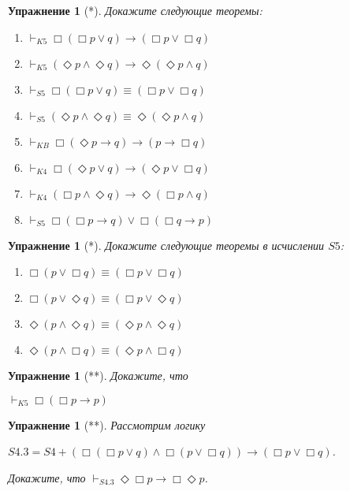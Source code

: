 \documentclass[11pt]{article}
\newtheorem{exercise}[theorem]{Упражнение}
\begin{document}
\begin{exercise}[*] Докажите следующие теоремы:
\begin{multicols}{2}
\begin{enumerate}
    \item $\vdash_{K5} \Box (\Box p \vee q ) \to (\Box p \vee \Box q)$
    \item $\vdash_{K5} (\Diamond p \wedge \Diamond q) \to \Diamond (\Diamond p \wedge q) $
    \item $\vdash_{S5} \Box (\Box p \vee q ) \equiv (\Box p \vee \Box q)$
    \item $\vdash_{S5} (\Diamond p \wedge \Diamond q) \equiv \Diamond (\Diamond p \wedge q) $
    \item $\vdash_{KB} \Box (\Diamond p \to q) \to (p \to \Box q)$
    \item $\vdash_{K4} \Box (\Diamond p \vee q ) \to (\Diamond p \vee \Box q)$
    \item $\vdash_{K4} (\Box p \wedge \Diamond q) \to \Diamond (\Box p \wedge q) $
    \item $\vdash_{S5} \Box (\Box p \to q) \vee \Box (\Box q \to p)$
\end{enumerate}
\end{multicols}
\end{exercise}

\begin{exercise}[*] Докажите следующие теоремы в исчислении $S5$:
\begin{multicols}{2}
\begin{enumerate}
\item $\Box (p \vee \Box q) \equiv (\Box p \vee \Box q)$
\item $\Box (p \vee \Diamond q) \equiv (\Box p \vee \Diamond q)$
\item $\Diamond (p \wedge \Diamond q) \equiv (\Diamond p \wedge \Diamond q)$
\item $\Diamond (p \wedge \Box q) \equiv (\Diamond p \wedge \Box q)$
\end{enumerate}
\end{multicols}
\end{exercise}

\begin{exercise}[**]
Докажите, что 
\begin{center}
$ \vdash_{K5} \Box (\Box p \to p)$
\end{center}
\end{exercise}


\begin{exercise}[**]
Рассмотрим логику 
\begin{center}
$S4.3 = S4 + (\Box (\Box p \vee q) \wedge \Box (p\vee \Box q)) \to (\Box p \vee \Box q) $.	
\end{center}

 Докажите, что 
$\vdash_{S4.3} \Diamond \Box p \to \Box \Diamond p$.
\end{exercise}
\end{document}
